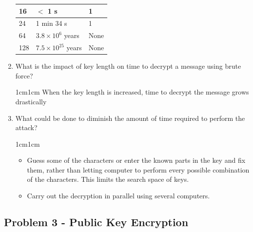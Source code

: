 \documentclass[11pt,letterpaper]{article}
\newenvironment{answer}{\em \color{blue} \begin{adjustwidth}{1cm}{1cm}}{\end{adjustwidth}}
\begin{document}
\begin{enumerate}
\begin{table}[h!]
\begin{tabularx}{\columnwidth}{|p{4cm}|X|X|}
				\hline
				16 & $<$ 1 s & 1 \\\hline
				
				\hline
				24 & 1 min 34 s & 1\\ \hline
				
				\hline
				64 & $3.8\times10^6$ years& None \\ \hline
				
				\hline
				128 &$7.5\times10^{25}$ years& None\\ \hline
				
			\end{tabularx}
		\end{table}
		\item What is the impact of key length on time to decrypt a message using brute force?
		\begin{answer}
			When the key length is increased, time to decrypt the message grows drastically
		\end{answer}
		\item What could be done to diminish the amount of time required to perform the attack?
		\begin{answer}
			\begin{itemize}
				\item Guess some of the characters or enter the known parts in the key and fix them, rather than letting computer to perform every possible combination of the characters. This limits the search space of keys.
				
				\item Carry out the decryption in parallel using several computers.
			\end{itemize}
		\end{answer}
		
	\end{enumerate}
	\pagebreak
	\subsection*{Problem 3 - Public Key Encryption}
	
\end{document}
